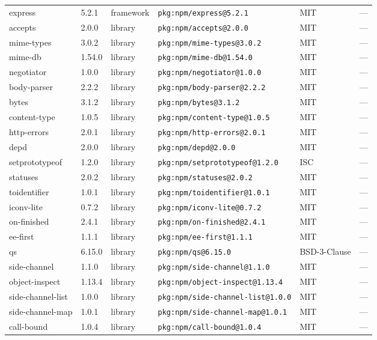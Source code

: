 \documentclass[11pt]{article}
\begin{document}
\begin{longtable}{|l|l|l|p{2.2cm}|l|p{4cm}|}
express & 5.2.1 & framework & \texttt{pkg:npm/express@5.2.1} & MIT & — \\
accepts & 2.0.0 & library & \texttt{pkg:npm/accepts@2.0.0} & MIT & — \\
mime-types & 3.0.2 & library & \texttt{pkg:npm/mime-types@3.0.2} & MIT & — \\
mime-db & 1.54.0 & library & \texttt{pkg:npm/mime-db@1.54.0} & MIT & — \\
negotiator & 1.0.0 & library & \texttt{pkg:npm/negotiator@1.0.0} & MIT & — \\
body-parser & 2.2.2 & library & \texttt{pkg:npm/body-parser@2.2.2} & MIT & — \\
bytes & 3.1.2 & library & \texttt{pkg:npm/bytes@3.1.2} & MIT & — \\
content-type & 1.0.5 & library & \texttt{pkg:npm/content-type@1.0.5} & MIT & — \\
http-errors & 2.0.1 & library & \texttt{pkg:npm/http-errors@2.0.1} & MIT & — \\
depd & 2.0.0 & library & \texttt{pkg:npm/depd@2.0.0} & MIT & — \\
setprototypeof & 1.2.0 & library & \texttt{pkg:npm/setprototypeof@1.2.0} & ISC & — \\
statuses & 2.0.2 & library & \texttt{pkg:npm/statuses@2.0.2} & MIT & — \\
toidentifier & 1.0.1 & library & \texttt{pkg:npm/toidentifier@1.0.1} & MIT & — \\
iconv-lite & 0.7.2 & library & \texttt{pkg:npm/iconv-lite@0.7.2} & MIT & — \\
on-finished & 2.4.1 & library & \texttt{pkg:npm/on-finished@2.4.1} & MIT & — \\
ee-first & 1.1.1 & library & \texttt{pkg:npm/ee-first@1.1.1} & MIT & — \\
qs & 6.15.0 & library & \texttt{pkg:npm/qs@6.15.0} & BSD-3-Clause & — \\
side-channel & 1.1.0 & library & \texttt{pkg:npm/side-channel@1.1.0} & MIT & — \\
object-inspect & 1.13.4 & library & \texttt{pkg:npm/object-inspect@1.13.4} & MIT & — \\
side-channel-list & 1.0.0 & library & \texttt{pkg:npm/side-channel-list@1.0.0} & MIT & — \\
side-channel-map & 1.0.1 & library & \texttt{pkg:npm/side-channel-map@1.0.1} & MIT & — \\
call-bound & 1.0.4 & library & \texttt{pkg:npm/call-bound@1.0.4} & MIT & — \\

\end{longtable}
\end{document}
